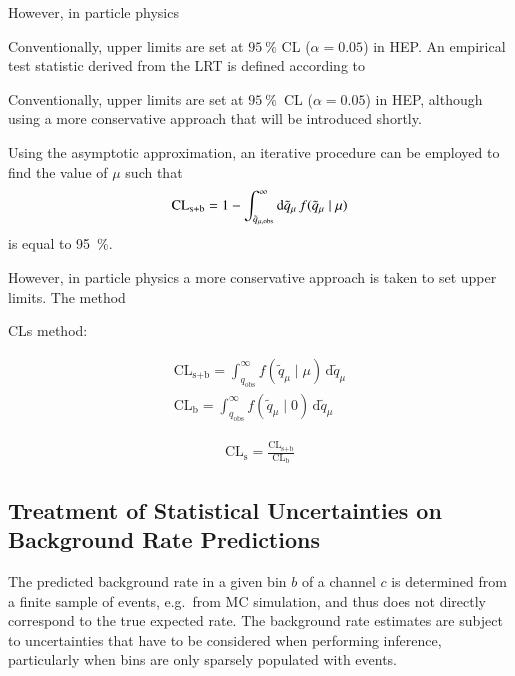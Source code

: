 

However, in particle physics






\vspace{5em}

Conventionally, upper limits are set at $\SI{95}{\percent}$ CL
($\alpha = 0.05$) in HEP. An empirical test statistic derived from the LRT is
defined according to


Conventionally, upper limits are set at $\SI{95}{\percent}$~CL
($\alpha = 0.05$) in HEP, although using a more conservative approach that will
be introduced shortly.


Using the asymptotic approximation, an iterative procedure can be employed to
find the value of $\mu$ such that
\begin{align*}
  \text{CL}_{\text{s}+\text{b}}
  = 1 - \int_{\tilde{q}_{\mu, \text{obs}}}^{\infty} \mathrm{d}\tilde{q}_{\mu} \, f(\tilde{q}_{\mu} \mid \mu)
\end{align*}
is equal to \SI{95}{\percent}.



However, in particle physics a more conservative approach is taken to set upper
limits. The \CLs method


CLs method:

\begin{align}
  \text{CL}_\text{s+b} = \int^\infty_{q_\text{obs}} f(\tilde{q}_\mu \mid \mu) \, \mathrm{d}\tilde{q}_\mu \\
  \text{CL}_\text{b} = \int^\infty_{q_\text{obs}} f(\tilde{q}_\mu \mid 0) \, \mathrm{d}\tilde{q}_\mu
\end{align}


\begin{align}
  \text{CL}_\text{s} = \frac{\text{CL}_\text{s+b}}{\text{CL}_\text{b}}
\end{align}


\subsection{Treatment of Statistical Uncertainties on Background Rate
  Predictions}%
\label{sec:barlow_beeston}

The predicted background rate in a given bin $b$ of a channel $c$ is
determined from a finite sample of events, e.g.\ from MC simulation,
and thus does not directly correspond to the true expected rate. The
background rate estimates are subject to uncertainties that have to be
considered when performing inference, particularly when bins are only
sparsely populated with events.

